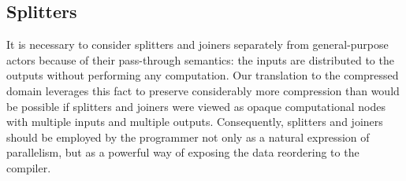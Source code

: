 



\subsection{Splitters}

It is necessary to consider splitters and joiners separately from
general-purpose actors because of their pass-through semantics: the
inputs are distributed to the outputs without performing any
computation.  Our translation to the compressed domain leverages this
fact to preserve considerably more compression than would be possible
if splitters and joiners were viewed as opaque computational nodes
with multiple inputs and multiple outputs.  Consequently, splitters
and joiners should be employed by the programmer not only as a natural
expression of parallelism, but as a powerful way of exposing the data
reordering to the compiler.

